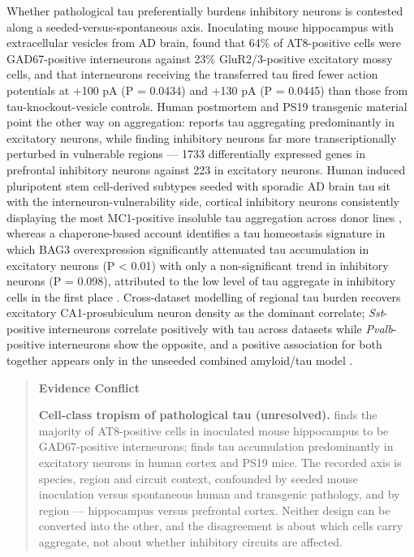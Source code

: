 \documentclass[11pt]{article}
\begin{document}
Whether pathological tau preferentially burdens inhibitory neurons is contested along a seeded-versus-spontaneous axis. Inoculating mouse hippocampus with extracellular vesicles from AD brain, \citet{Ruan2020} found that 64\% of AT8-positive cells were GAD67-positive interneurons against 23\% GluR2/3-positive excitatory mossy cells, and that interneurons receiving the transferred tau fired fewer action potentials at +100 pA (P = 0.0434) and +130 pA (P = 0.0445) than those from tau-knockout-vesicle controls. Human postmortem and PS19 transgenic material point the other way on aggregation: \citet{Broekaart2025} reports tau aggregating predominantly in excitatory neurons, while finding inhibitory neurons far more transcriptionally perturbed in vulnerable regions --- 1733 differentially expressed genes in prefrontal inhibitory neurons against 223 in excitatory neurons. Human induced pluripotent stem cell-derived subtypes seeded with sporadic AD brain tau sit with the interneuron-vulnerability side, cortical inhibitory neurons consistently displaying the most MC1-positive insoluble tau aggregation across donor lines \citep{Weidling2025}, whereas a chaperone-based account identifies a tau homeostasis signature in which BAG3 overexpression significantly attenuated tau accumulation in excitatory neurons (P < 0.01) with only a non-significant trend in inhibitory neurons (P = 0.098), attributed to the low level of tau aggregate in inhibitory cells in the first place \citep{Fu2018}. Cross-dataset modelling of regional tau burden recovers excitatory CA1-prosubiculum neuron density as the dominant correlate; \emph{Sst}-positive interneurons correlate positively with tau across datasets while \emph{Pvalb}-positive interneurons show the opposite, and a positive association for both together appears only in the unseeded combined amyloid/tau model \citep{Torok2025}.

\begin{quote}
\noindent\textbf{Evidence Conflict}\par
\textbf{Cell-class tropism of pathological tau (unresolved).} \citet{Ruan2020} finds the majority of AT8-positive cells in inoculated mouse hippocampus to be GAD67-positive interneurons; \citet{Broekaart2025} finds tau accumulation predominantly in excitatory neurons in human cortex and PS19 mice. The recorded axis is species, region and circuit context, confounded by seeded mouse inoculation versus spontaneous human and transgenic pathology, and by region --- hippocampus versus prefrontal cortex. Neither design can be converted into the other, and the disagreement is about which cells carry aggregate, not about whether inhibitory circuits are affected.

\end{quote}
\end{document}
